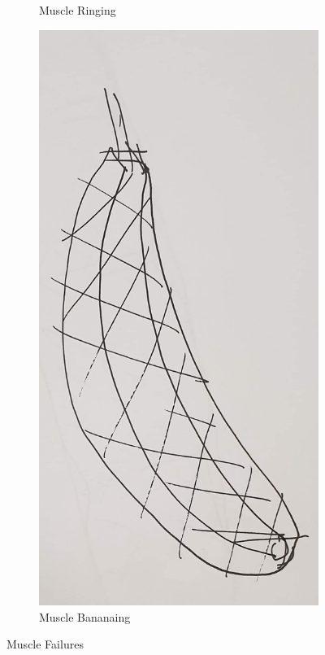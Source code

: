 \documentclass[11pt,a4paper]{article}
\begin{document}
\begin{figure}[hbt!]
\begin{subfigure}[t]{0.45 \textwidth}
        \caption{Muscle Ringing}
        \label{fig:incompatible_rings}
    \end{subfigure}
    \begin{subfigure}[t]{0.45 \textwidth}
        \centering
        \includegraphics[scale=0.1]{MuscleBananaing.png}
        \caption{Muscle Bananaing}
        \label{fig:incompatible_banana}
    \end{subfigure}
    \caption{Muscle Failures}
    \label{fig:incompatible_muscles}
\end{figure}
\end{document}
